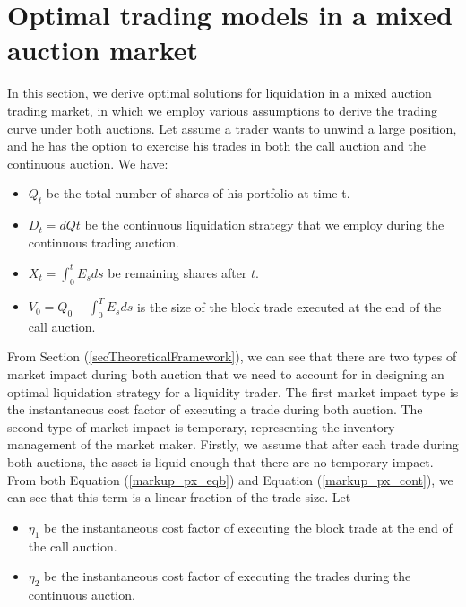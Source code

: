 \documentclass{article}
\begin{document}
\section{Optimal trading models in a mixed auction market}\label{secModel}

In this section, we derive optimal solutions for liquidation in a mixed auction trading market, in which we employ various assumptions to derive the trading curve under both auctions. Let assume a trader wants to unwind a large position, and he has the option to exercise his trades in both the call auction and the continuous auction. We have:

\begin{itemize}
  \item $Q_t$ be the total number of shares of his portfolio at time t.
  \item $D_t=dQt$ be the continuous liquidation strategy that we employ during the continuous trading auction.
  \item $X_t=\int_0^t E_s ds$ be remaining shares after $t$.
  \item $V_0=Q_0 - \int_0^T E_s ds$ is the size of the block trade executed at the end of the call auction.
\end{itemize}

From Section (\ref{secTheoreticalFramework}), we can see that there are two types of market impact during both auction that we need to account for in designing an optimal liquidation strategy for a liquidity trader. The first market impact type is the instantaneous cost factor of executing a trade during both auction. The second type of market impact is temporary, representing the inventory management of the market maker. Firstly, we assume that after each trade during both auctions, the asset is liquid enough that there are no temporary impact. From both Equation (\ref{markup_px_eqb}) and Equation (\ref{markup_px_cont}), we can see that this term is a linear fraction of the trade size. Let
\begin{itemize}
  \item $\eta_1$ be the instantaneous cost factor of executing the block trade at the end of the call auction.
  \item $\eta_2$ be the instantaneous cost factor of executing the trades during the continuous auction.
\end{itemize}
\end{document}
